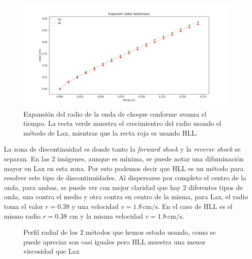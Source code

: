 \documentclass[12pt,a4paper]{book}
\begin{document}
\begin{figure}[H]
\centering
\includegraphics[width=1.0\textwidth]{./Figuras/Pruebas/expansion_radial/expansion_radial_newtoniano}
\caption{\label{fig:expansion_radial_newtoniano}Expansión del radio de la onda de choque conforme avanza el tiempo. La recta verde muestra el crecimientro del radio usando el método de Lax, mientras que la recta roja es usando HLL. } 
\end{figure}


La zona de discontinuidad es donde tanto la \emph{forward shock} y la \emph{reverse shock} se separan. En las 2 imágenes, aunque es mínima, se puede notar una difuminación mayor en Lax en esta zona. Por esto podemos decir que HLL es un método para resolver este tipo de discontinuidades. Al dispersarse por completo el centro de la onda, para ambas, se puede ver con mejor claridad que hay 2 diferentes tipos de onda, una contra el medio y otra contra en centro de la misma, para Lax, el radio toma el valor $r = 0.38$ y una velocidad $v = 1.8 \, \mathrm{cm}/\mathrm{s} $. En el caso de HLL es el mismo radio $r = 0.38 $ cm y la misma velocidad $v = 1.8 \, \mathrm{cm}/\mathrm{s}$.

\begin{figure}[H]
\centering
{}
\caption{Perfil radial de los 2 métodos que hemos estado usando, como se puede apreciar son casi iguales pero HLL muestra una menor viscosidad que Lax}
\end{figure}
\end{document}

